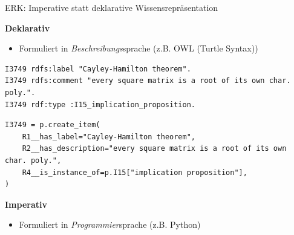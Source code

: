 \documentclass[
	ngerman,
	10pt,				%
	aspectratio=169 	%
]{beamer}
\begin{document}
\begin{frame}[t,fragile,label=erk2]{\large ERK: Imperative statt deklarative Wissensrepräsentation}

\textbf{Deklarativ}
\begin{itemize}
 \item Formuliert in \textit{Beschreibungs}sprache (z.B. OWL (Turtle Syntax))
\end{itemize}





\begin{lrbox}{\mysaveboxa}
\begin{lstlisting}
I3749 rdfs:label "Cayley-Hamilton theorem".
I3749 rdfs:comment "every square matrix is a root of its own char. poly.".
I3749 rdf:type :I15_implication_proposition.
\end{lstlisting}
\end{lrbox}




\begin{lrbox}{\mysaveboxb}
\begin{lstlisting}
I3749 = p.create_item(
    R1__has_label="Cayley-Hamilton theorem",
    R2__has_description="every square matrix is a root of its own char. poly.",
    R4__is_instance_of=p.I15["implication proposition"],
)
\end{lstlisting}
\end{lrbox}

\pause
\pause
\bigskip

\textbf{Imperativ}
\begin{itemize}
 \item Formuliert in \textit{Programmier}sprache (z.B. Python)
\end{itemize}

\end{frame}
  
\end{document}
